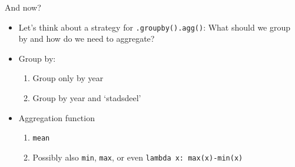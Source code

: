 \documentclass[handout]{beamer}
\begin{document}
\begin{frame}{And now?}
\begin{itemize}[<+->]
	\item Let’s think about a strategy for \texttt{.groupby().agg()}: What should we group by and how do we need to aggregate?
	\item Group by:
	\begin{enumerate}
		\item Group only by year
		\item  Group by year and `stadsdeel'
	\end{enumerate}
	\item Aggregation function
	\begin{enumerate}
		\item \texttt{mean}
		\item Possibly also \texttt{min}, \texttt{max}, or even \texttt{lambda x: max(x)-min(x)}
	\end{enumerate}
\end{itemize}

\end{frame}
\end{document}

